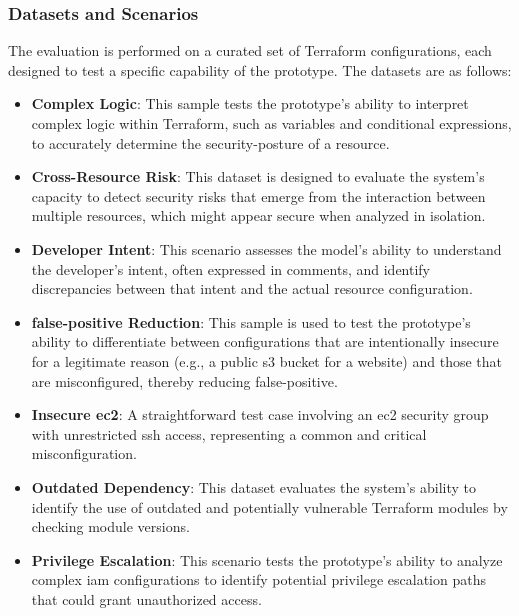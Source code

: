 \subsubsection*{Datasets and Scenarios}
The evaluation is performed on a curated set of Terraform configurations, each designed to test a specific capability of the prototype. The datasets are as follows:
\begin{itemize}
    \item \textbf{Complex Logic}: This sample tests the prototype's ability to interpret complex logic within Terraform, such as variables and conditional expressions, to accurately determine the \gls{security-posture} of a resource.
    \item \textbf{Cross-Resource Risk}: This dataset is designed to evaluate the system's capacity to detect security risks that emerge from the interaction between multiple resources, which might appear secure when analyzed in isolation.
    \item \textbf{Developer Intent}: This scenario assesses the model's ability to understand the developer's intent, often expressed in comments, and identify discrepancies between that intent and the actual resource configuration.
    \item \textbf{\gls{false-positive} Reduction}: This sample is used to test the prototype's ability to differentiate between configurations that are intentionally insecure for a legitimate reason (e.g., a public \gls{s3} bucket for a website) and those that are misconfigured, thereby reducing \gls{false-positive}.
    \item \textbf{Insecure \gls{ec2}}: A straightforward test case involving an \gls{ec2} security group with unrestricted \gls{ssh} access, representing a common and critical misconfiguration.
    \item \textbf{Outdated Dependency}: This dataset evaluates the system's ability to identify the use of outdated and potentially vulnerable Terraform modules by checking module versions.
    \item \textbf{Privilege Escalation}: This scenario tests the prototype's ability to analyze complex \gls{iam} configurations to identify potential privilege escalation paths that could grant unauthorized access.
\end{itemize}


